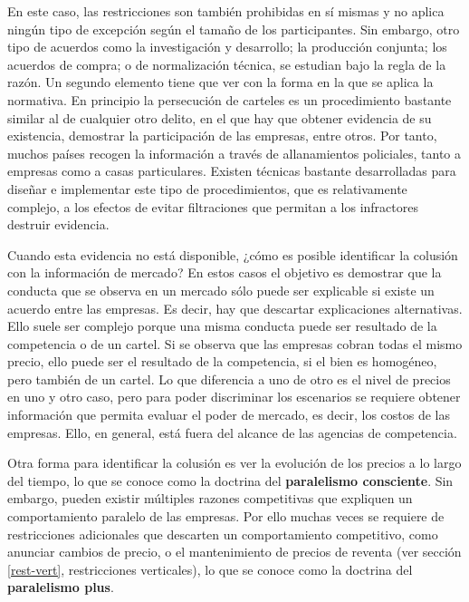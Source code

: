 \documentclass[
  12pt,
  spanish,
]{book}
\begin{document}
En este caso, las restricciones son también prohibidas en sí mismas y no aplica ningún tipo de excepción según el tamaño de los participantes. Sin embargo, otro tipo de acuerdos como la investigación y desarrollo; la producción conjunta; los acuerdos de compra; o de normalización técnica, se estudian bajo la regla de la razón. Un segundo elemento tiene que ver con la forma en la que se aplica la normativa. En principio la persecución de carteles es un procedimiento bastante similar al de cualquier otro delito, en el que hay que obtener evidencia de su existencia, demostrar la participación de las empresas, entre otros. Por tanto, muchos países recogen la información a través de allanamientos policiales, tanto a empresas como a casas particulares. Existen técnicas bastante desarrolladas para diseñar e implementar este tipo de procedimientos, que es relativamente complejo, a los efectos de evitar filtraciones que permitan a los infractores destruir evidencia.

Cuando esta evidencia no está disponible, ¿cómo es posible identificar la colusión con la información de mercado? En estos casos el objetivo es demostrar que la conducta que se observa en un mercado sólo puede ser explicable si existe un acuerdo entre las empresas. Es decir, hay que descartar explicaciones alternativas. Ello suele ser complejo porque una misma conducta puede ser resultado de la competencia o de un cartel. Si se observa que las empresas cobran todas el mismo precio, ello puede ser el resultado de la competencia, si el bien es homogéneo, pero también de un cartel. Lo que diferencia a uno de otro es el nivel de precios en uno y otro caso, pero para poder discriminar los escenarios se requiere obtener información que permita evaluar el poder de mercado, es decir, los costos de las empresas. Ello, en general, está fuera del alcance de las agencias de competencia.

Otra forma para identificar la colusión es ver la evolución de los precios a lo largo del tiempo, lo que se conoce como la doctrina del \textbf{paralelismo consciente}. Sin embargo, pueden existir múltiples razones competitivas que expliquen un comportamiento paralelo de las empresas. Por ello muchas veces se requiere de restricciones adicionales que descarten un comportamiento competitivo, como anunciar cambios de precio, o el mantenimiento de precios de reventa (ver sección \ref{rest-vert}, restricciones verticales), lo que se conoce como la doctrina del \textbf{paralelismo plus}.
\end{document}
